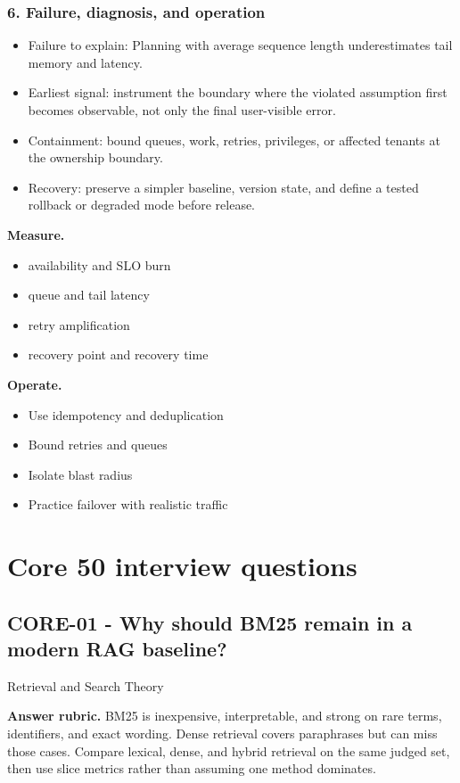 \subsubsection*{6. Failure, diagnosis, and operation}
\begin{itemize}
\item Failure to explain: Planning with average sequence length underestimates tail memory and latency.
\item Earliest signal: instrument the boundary where the violated assumption first becomes observable, not only the final user-visible error.
\item Containment: bound queues, work, retries, privileges, or affected tenants at the ownership boundary.
\item Recovery: preserve a simpler baseline, version state, and define a tested rollback or degraded mode before release.
\end{itemize}
\textbf{Measure.}\begin{itemize}
\item availability and SLO burn
\item queue and tail latency
\item retry amplification
\item recovery point and recovery time
\end{itemize}
\textbf{Operate.}\begin{itemize}
\item Use idempotency and deduplication
\item Bound retries and queues
\item Isolate blast radius
\item Practice failover with realistic traffic
\end{itemize}
\clearpage\section{Core 50 interview questions}
\subsection*{CORE-01 - Why should BM25 remain in a modern RAG baseline?}
 \quad Retrieval and Search Theory
\par\smallskip\textbf{Answer rubric.} BM25 is inexpensive, interpretable, and strong on rare terms, identifiers, and exact wording. Dense retrieval covers paraphrases but can miss those cases. Compare lexical, dense, and hybrid retrieval on the same judged set, then use slice metrics rather than assuming one method dominates.
